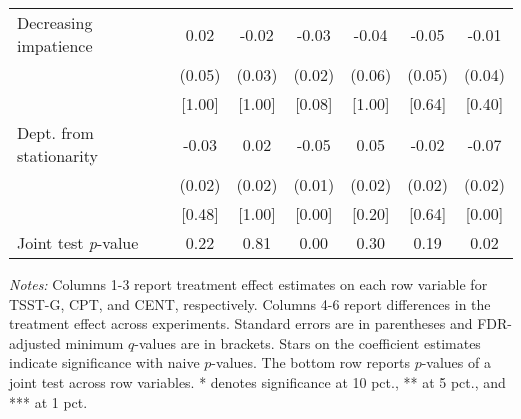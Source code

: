\begin{table}[htbp]
{\begin{threeparttable}
\begin{tabular}{l*{6}{c}}
Decreasing impatience&     0.02&    -0.02&    -0.03&    -0.04&    -0.05&    -0.01\\
          &   (0.05)&   (0.03)&   (0.02)&   (0.06)&   (0.05)&   (0.04)\\
          &   [1.00]&   [1.00]&[0.08\sym{*}]&   [1.00]&   [0.64]&   [0.40]\\
Dept. from stationarity&-0.03\sym{*}&     0.02&-0.05\sym{***}&0.05\sym{**}&    -0.02&-0.07\sym{***}\\
          &   (0.02)&   (0.02)&   (0.01)&   (0.02)&   (0.02)&   (0.02)\\
          &   [0.48]&   [1.00]&[0.00\sym{***}]&   [0.20]&   [0.64]&[0.00\sym{***}]\\
\midrule Joint test \emph{p}-value&     0.22&     0.81&0.00\sym{***}&     0.30&     0.19&0.02\sym{**}\\
\bottomrule \end{tabular} \begin{tablenotes}[flushleft] \footnotesize \item \emph{Notes:} Columns 1-3 report treatment effect estimates on each row variable for TSST-G, CPT, and CENT, respectively. Columns 4-6 report differences in the treatment effect across experiments. Standard errors are in parentheses and FDR-adjusted minimum \(q\)-values are in brackets. Stars on the coefficient estimates indicate significance with naive \(p\)-values. The bottom row reports \(p\)-values of a joint test across row variables. * denotes significance at 10 pct., ** at 5 pct., and *** at 1 pct. \end{tablenotes} \end{threeparttable} } \end{table}
